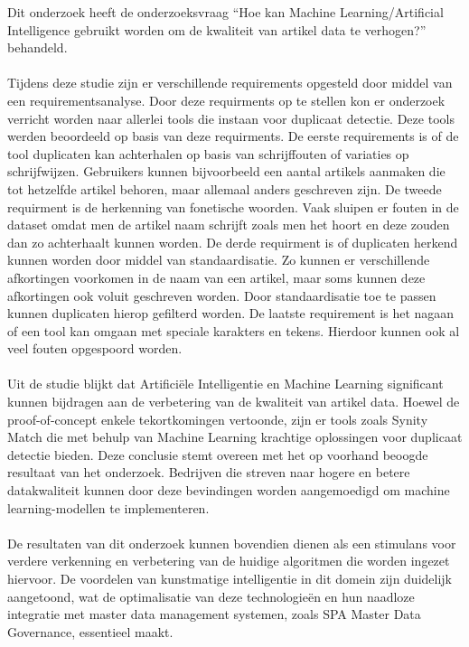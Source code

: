 Dit onderzoek heeft de onderzoeksvraag “Hoe kan Machine Learning/Artificial Intelligence gebruikt worden om de kwaliteit van artikel data te verhogen?” behandeld. 
\\ \\Tijdens deze studie zijn er verschillende requirements opgesteld door middel van een requirementsanalyse. Door deze requirments op te stellen kon er onderzoek verricht worden naar allerlei tools die instaan voor duplicaat detectie. Deze tools werden beoordeeld op basis van deze requirments. De eerste requirements is of de tool duplicaten kan achterhalen op basis van schrijffouten of variaties op schrijfwijzen. Gebruikers kunnen bijvoorbeeld een aantal artikels aanmaken die tot hetzelfde artikel behoren, maar allemaal anders geschreven zijn. De tweede requirment is de herkenning van fonetische woorden. Vaak sluipen er fouten in de dataset omdat men de artikel naam schrijft zoals men het hoort en deze zouden dan zo achterhaalt kunnen worden. De derde requirment is of duplicaten herkend kunnen worden door middel van standaardisatie. Zo kunnen er verschillende afkortingen voorkomen in de naam van een artikel, maar soms kunnen deze afkortingen ook voluit geschreven worden. Door standaardisatie toe te passen kunnen duplicaten hierop gefilterd worden. De laatste requirement is het nagaan of een tool kan omgaan met speciale karakters en tekens. Hierdoor kunnen ook al veel fouten opgespoord worden.
\\ \\Uit de studie blijkt dat Artificiële Intelligentie en Machine Learning significant kunnen bijdragen aan de verbetering  van de kwaliteit van artikel data. Hoewel de proof-of-concept enkele tekortkomingen vertoonde, zijn er tools zoals Synity Match die met behulp van Machine Learning krachtige oplossingen voor duplicaat detectie bieden. Deze conclusie stemt overeen met het op voorhand beoogde resultaat van het onderzoek. Bedrijven die streven naar hogere en betere datakwaliteit kunnen door deze bevindingen worden aangemoedigd om machine learning-modellen te implementeren.
\\ \\De resultaten van dit onderzoek kunnen bovendien dienen als een stimulans voor verdere verkenning en verbetering van de huidige algoritmen die worden ingezet hiervoor. De voordelen van kunstmatige intelligentie in dit domein zijn duidelijk aangetoond, wat de optimalisatie van deze technologieën en hun naadloze integratie met master data management systemen, zoals SPA Master Data Governance, essentieel maakt.

